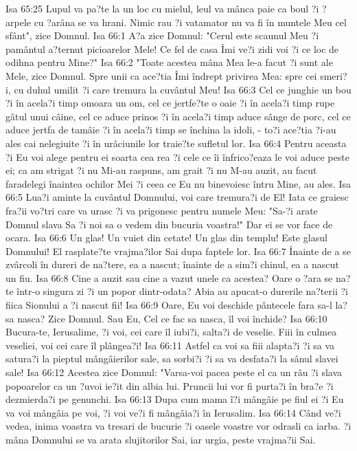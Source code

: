 Isa 65:25  Lupul va pa?te la un loc cu mielul, leul va mânca paie ca boul ?i ?arpele cu ?arâna se va hrani. Nimic rau ?i vatamator nu va fi în muntele Meu cel sfânt", zice Domnul.
Isa 66:1  A?a zice Domnul: "Cerul este scaunul Meu ?i pamântul a?ternut picioarelor Mele! Ce fel de casa Îmi ve?i zidi voi ?i ce loc de odihna pentru Mine?"
Isa 66:2  "Toate acestea mâna Mea le-a facut ?i sunt ale Mele, zice Domnul. Spre unii ca ace?tia Îmi îndrept privirea Mea: spre cei smeri?i, cu duhul umilit ?i care tremura la cuvântul Meu!
Isa 66:3  Cel ce junghie un bou ?i în acela?i timp omoara un om, cel ce jertfe?te o oaie ?i în acela?i timp rupe gâtul unui câine, cel ce aduce prinos ?i în acela?i timp aduce sânge de porc, cel ce aduce jertfa de tamâie ?i în acela?i timp se închina la idoli, - to?i ace?tia ?i-au ales cai nelegiuite ?i în urâciunile lor traie?te sufletul lor.
Isa 66:4  Pentru aceasta ?i Eu voi alege pentru ei soarta cea rea ?i cele ce îi înfrico?eaza le voi aduce peste ei; ca am strigat ?i nu Mi-au raspuns, am grait ?i nu M-au auzit, au facut faradelegi înaintea ochilor Mei ?i ceea ce Eu nu binevoiesc întru Mine, au ales.
Isa 66:5  Lua?i aminte la cuvântul Domnului, voi care tremura?i de El! Iata ce graiesc fra?ii vo?tri care va urasc ?i va prigonesc pentru numele Meu: "Sa-?i arate Domnul slava Sa ?i noi sa o vedem din bucuria voastra!" Dar ei se vor face de ocara.
Isa 66:6  Un glas! Un vuiet din cetate! Un glas din templu! Este glasul Domnului! El rasplate?te vrajma?ilor Sai dupa faptele lor.
Isa 66:7  Înainte de a se zvârcoli în dureri de na?tere, ea a nascut; înainte de a sim?i chinul, ea a nascut un fiu.
Isa 66:8  Cine a auzit sau cine a vazut unele ca acestea? Oare o ?ara se na?te într-o singura zi ?i un popor dintr-odata? Abia au apucat-o durerile na?terii ?i fiica Sionului a ?i nascut fii!
Isa 66:9  Oare, Eu voi deschide pântecele fara sa-l la? sa nasca? Zice Domnul. Sau Eu, Cel ce fac sa nasca, îl voi închide?
Isa 66:10  Bucura-te, Ierusalime, ?i voi, cei care îl iubi?i, salta?i de veselie. Fiii în culmea veseliei, voi cei care îl plângea?i!
Isa 66:11  Astfel ca voi sa fiii alapta?i ?i sa va satura?i la pieptul mângâierilor sale, sa sorbi?i ?i sa va desfata?i la sânul slavei sale!
Isa 66:12  Acestea zice Domnul: "Varsa-voi pacea peste el ca un râu ?i slava popoarelor ca un ?uvoi ie?it din albia lui. Pruncii lui vor fi purta?i în bra?e ?i dezmierda?i pe genunchi.
Isa 66:13  Dupa cum mama î?i mângâie pe fiul ei ?i Eu va voi mângâia pe voi, ?i voi ve?i fi mângâia?i în Ierusalim.
Isa 66:14  Când ve?i vedea, inima voastra va tresari de bucurie ?i oasele voastre vor odrasli ca iarba. ?i mâna Domnului se va arata slujitorilor Sai, iar urgia, peste vrajma?ii Sai.
